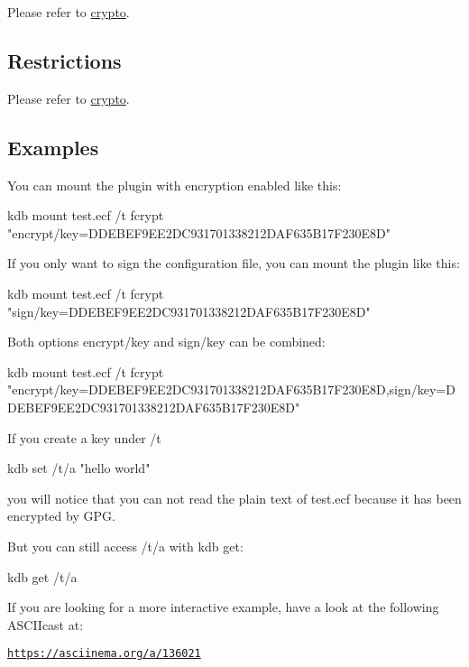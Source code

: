 Please refer to \hyperlink{md_src_plugins_crypto_README_src_plugins_crypto_README_md}{crypto}.

\subsection*{Restrictions}

Please refer to \hyperlink{md_src_plugins_crypto_README_src_plugins_crypto_README_md}{crypto}.

\subsection*{Examples}

You can mount the plugin with encryption enabled like this\+: \begin{DoxyVerb}    kdb mount test.ecf /t fcrypt "encrypt/key=DDEBEF9EE2DC931701338212DAF635B17F230E8D"
\end{DoxyVerb}


If you only want to sign the configuration file, you can mount the plugin like this\+: \begin{DoxyVerb}    kdb mount test.ecf /t fcrypt "sign/key=DDEBEF9EE2DC931701338212DAF635B17F230E8D"
\end{DoxyVerb}


Both options {\ttfamily encrypt/key} and {\ttfamily sign/key} can be combined\+: \begin{DoxyVerb}    kdb mount test.ecf /t fcrypt "encrypt/key=DDEBEF9EE2DC931701338212DAF635B17F230E8D,sign/key=DDEBEF9EE2DC931701338212DAF635B17F230E8D"
\end{DoxyVerb}


If you create a key under {\ttfamily /t} \begin{DoxyVerb}    kdb set /t/a "hello world"
\end{DoxyVerb}


you will notice that you can not read the plain text of {\ttfamily test.\+ecf} because it has been encrypted by G\+PG.

But you can still access {\ttfamily /t/a} with {\ttfamily kdb get}\+: \begin{DoxyVerb}    kdb get /t/a
\end{DoxyVerb}


If you are looking for a more interactive example, have a look at the following A\+S\+C\+I\+Icast at\+:

\href{https://asciinema.org/a/136021}{\tt https\+://asciinema.\+org/a/136021}

